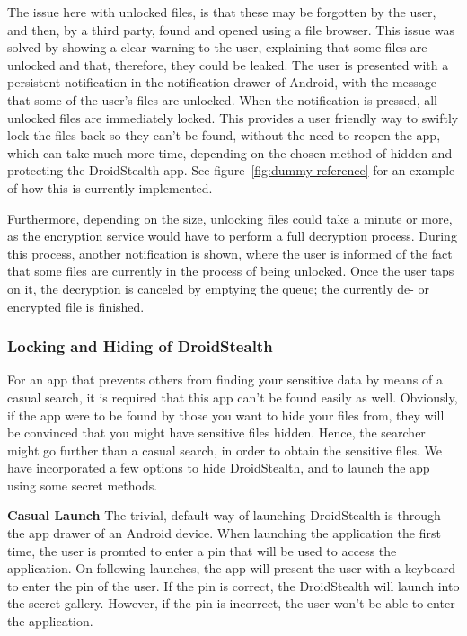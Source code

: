 The issue here with unlocked files, is that these may be
forgotten by the user, and then, by a third party, found and
opened using a file browser. This issue was solved by showing
a clear warning to the user, explaining that some files are
unlocked and that, therefore, they could be leaked.
The user is presented with a persistent notification in the
notification drawer of Android, with the message that some of
the user's files are unlocked. When the notification is pressed,
all unlocked files are immediately locked. This
provides a user friendly way to swiftly lock the files back so
they can't be found, without the need to reopen the app, which
can take much more time, depending on the chosen method of
hidden and protecting the DroidStealth app. See figure~\ref{fig:dummy-reference} for
an example of how this is currently implemented.

Furthermore, depending on the size, unlocking files could take a
minute or more, as the encryption service would have to perform a
full decryption process. During this process, another notification 
is shown, where the user is informed
of the fact that some files are currently in the process of
being unlocked. Once the user taps on it, the decryption is
canceled by emptying the queue; the currently de- or encrypted file is finished.


\subsubsection{Locking and Hiding of DroidStealth}

For an app that prevents others from finding your sensitive
data by means of a casual search, it is required that this app
can't be found easily as well. Obviously, if the app were to be
found by those you want to hide your files from, they will be
convinced that you might have sensitive files hidden. Hence, the
searcher might go further than a casual search, in order to
obtain the sensitive files. We have incorporated a few options to hide 
DroidStealth, and to launch the app using some secret methods.

\textbf{Casual Launch}
The trivial, default way of launching DroidStealth is through the app drawer of an Android device. 
When launching the application the first time, the user is promted to enter a pin that will be used to access the application.
On following launches, the app will present the user with a keyboard to enter the pin of the user. If the pin is correct, the 
DroidStealth will launch into the secret gallery. However, if the pin is incorrect, the user won't be able to enter the application.


